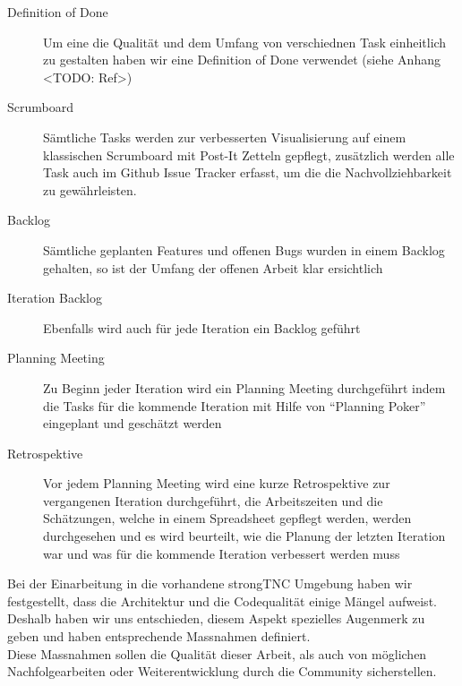 \begin{description}
	\item[Definition of Done] Um eine die Qualität und dem Umfang von verschiednen
	Task einheitlich zu gestalten haben wir eine Definition of Done verwendet
	(siehe Anhang <TODO: Ref>)
	
	\item[Scrumboard]Sämtliche Tasks werden zur verbesserten Visualisierung auf
	einem klassischen Scrumboard mit Post-It Zetteln gepflegt, zusätzlich werden
	alle Task auch im Github Issue Tracker erfasst, um die die Nachvollziehbarkeit
	zu gewährleisten.
	
	\item[Backlog] Sämtliche geplanten Features und offenen Bugs wurden in einem
	Backlog gehalten, so ist der Umfang der offenen Arbeit klar ersichtlich
	
	\item[Iteration Backlog] Ebenfalls wird auch für jede Iteration ein Backlog
	geführt
	
	\item[Planning Meeting] Zu Beginn jeder Iteration wird ein Planning Meeting
	durchgeführt indem die Tasks für die kommende Iteration mit Hilfe von
	\enquote{Planning Poker} eingeplant und geschätzt werden
	
	\item[Retrospektive] Vor jedem Planning Meeting wird eine kurze Retrospektive
	zur vergangenen Iteration durchgeführt, die Arbeitszeiten und die Schätzungen,
	welche in einem Spreadsheet gepflegt werden, werden durchgesehen und es wird
	beurteilt, wie die Planung der letzten Iteration war und was für die kommende
	Iteration verbessert werden muss
	
\end{description}

Bei der Einarbeitung in die vorhandene strongTNC Umgebung haben wir
festgestellt, dass die Architektur und die Codequalität einige Mängel aufweist.
Deshalb haben wir uns entschieden, diesem Aspekt spezielles Augenmerk zu geben
und haben entsprechende Massnahmen definiert.\\ 
Diese Massnahmen sollen die Qualität dieser Arbeit, als auch von möglichen
Nachfolgearbeiten oder Weiterentwicklung durch die Community sicherstellen.

